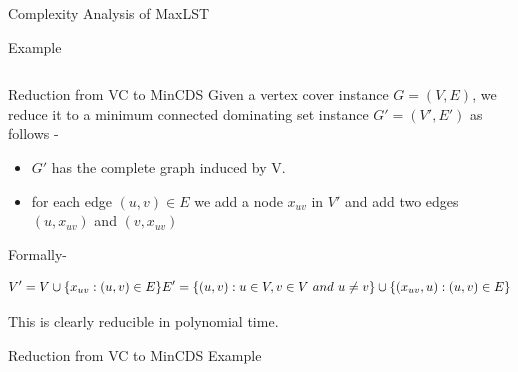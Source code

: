 \documentclass[xcolor=svgnames]{beamer}
\begin{document}
\begin{section}{Complexity Analysis of MaxLST}
\begin{frame}{Example}
\begin{columns}
\begin{column}{0.45\textwidth}
\begin{tikzpicture}
            \end{tikzpicture}
            \end{column}
        
        \end{columns}
        \vspace{15pt}
    \end{frame}
    \begin{frame}{Reduction from VC to MinCDS}
        Given a vertex cover instance $G = (V, E)$, we reduce it to a minimum connected dominating set instance $G' = (V', E')$ as follows -
        \begin{itemize}
            \item $G'$ has the complete graph induced by V.
            \item for each edge $(u,v) \in E$ we add a node $x_{uv}$ in $V'$ and add two edges $(u,x_{uv})$ and $(v,x_{uv})$
        \end{itemize}
        Formally-
        \begin{exampleblock}{}
            \centering
            \[
                V' = V \cup \{ x_{uv} : (u,v) \in E\} \\
                E' = \{(u,v) : u \in V, v \in V~ and~ u \neq v \} \cup \{(x_{uv},u) : (u,v) \in E \}
            \]
            \vspace{15pt}
        \end{exampleblock}
        This is clearly reducible in polynomial time.
    \end{frame}
    \begin{frame}{Reduction from VC to MinCDS Example}
        \centering
\end{frame}
\end{section}
\end{document}
